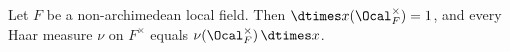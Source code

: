 Let $F$ be a non-archimedean local field. Then $\dtimes x(\Ocal_F^\times)=1$, and every Haar measure $\nu$ on
$F^\times$ equals $\nu(\Ocal_F^\times)\,\dtimes x$.
